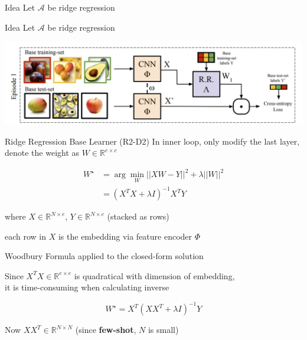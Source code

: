 \documentclass{beamer}
\begin{document}
\begin{frame}[t]{Idea}
  Let $\mathcal{A}$ be ridge regression
\end{frame}

\begin{frame}[t]{Idea}
  Let $\mathcal{A}$ be ridge regression

  \vspace{1cm}
  \includegraphics[width=\textwidth]{fig/r2d2.png}
\end{frame}

\begin{frame}[t]{Ridge Regression Base Learner (R2-D2)}
  In inner loop, only modify the last layer, denote the weight as $W \in \mathbb{R}^{e \times c}$

  \begin{equation*}
    \begin{aligned}
      W^\star &= \arg\min_W || XW-Y ||^2 + \lambda ||W||^2 \\
              &= (X^TX + \lambda I)^{-1} X^TY
    \end{aligned}
  \end{equation*}

  where $X \in \mathbb{R}^{N \times e}$, $Y \in \mathbb{R}^{N \times c}$ (stacked as rows)

  each row in $X$ is the embedding via feature encoder $\Phi$
\end{frame}

\begin{frame}[t]{Woodbury Formula applied to the closed-form solution}

  Since $X^T X \in  \mathbb{R}^{e \times e}$ is quadratical with dimension of embedding, \\
  it is time-consuming when calculating inverse

  \begin{equation*}
    \boxed{W^\star = X^T(X X^T + \lambda I)^{-1}Y}
  \end{equation*}

  Now $X X^T \in \mathbb{R}^{N \times N}$ (since \textbf{few-shot}, $N$ is small)
\end{frame}
\end{document}
